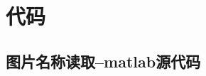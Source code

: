 \documentclass{whutmod}
\begin{document}
	\newpage
	\appendix %

\section{代码}
\subsection{图片名称读取--matlab源代码}
\begin{lstlisting}[language=matlab]

\end{lstlisting}
\end{document}
